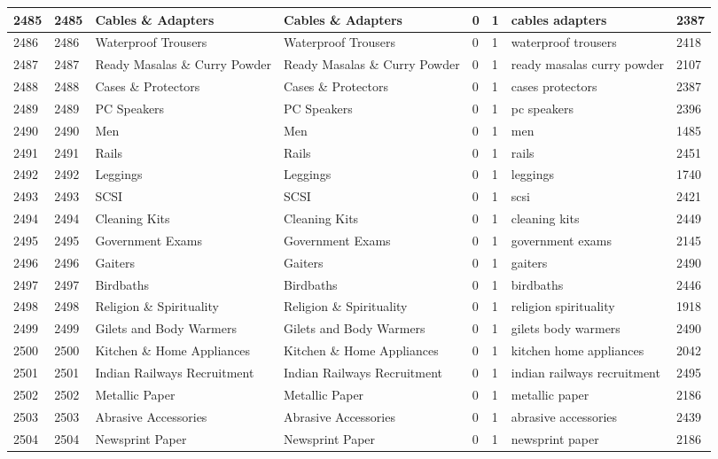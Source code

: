 \begin{longtable}{|l|l|l|l|l|l|l|l|}
2485 & 2485 & Cables \& Adapters & Cables \& Adapters & 0 & 1 & cables adapters & 2387 \\ \hline 
2486 & 2486 & Waterproof Trousers & Waterproof Trousers & 0 & 1 & waterproof trousers & 2418 \\ \hline 
2487 & 2487 & Ready Masalas \& Curry Powder & Ready Masalas \& Curry Powder & 0 & 1 & ready masalas curry powder & 2107 \\ \hline 
2488 & 2488 & Cases \& Protectors & Cases \& Protectors & 0 & 1 & cases protectors & 2387 \\ \hline 
2489 & 2489 & PC Speakers & PC Speakers & 0 & 1 & pc speakers & 2396 \\ \hline 
2490 & 2490 & Men & Men & 0 & 1 & men & 1485 \\ \hline 
2491 & 2491 & Rails & Rails & 0 & 1 & rails & 2451 \\ \hline 
2492 & 2492 & Leggings & Leggings & 0 & 1 & leggings & 1740 \\ \hline 
2493 & 2493 & SCSI & SCSI & 0 & 1 & scsi & 2421 \\ \hline 
2494 & 2494 & Cleaning Kits & Cleaning Kits & 0 & 1 & cleaning kits & 2449 \\ \hline 
2495 & 2495 & Government Exams & Government Exams & 0 & 1 & government exams & 2145 \\ \hline 
2496 & 2496 & Gaiters & Gaiters & 0 & 1 & gaiters & 2490 \\ \hline 
2497 & 2497 & Birdbaths & Birdbaths & 0 & 1 & birdbaths & 2446 \\ \hline 
2498 & 2498 & Religion \& Spirituality & Religion \& Spirituality & 0 & 1 & religion spirituality & 1918 \\ \hline 
2499 & 2499 & Gilets and Body Warmers & Gilets and Body Warmers & 0 & 1 & gilets body warmers & 2490 \\ \hline 
2500 & 2500 & Kitchen \& Home Appliances & Kitchen \& Home Appliances & 0 & 1 & kitchen home appliances & 2042 \\ \hline 
2501 & 2501 & Indian Railways Recruitment & Indian Railways Recruitment & 0 & 1 & indian railways recruitment & 2495 \\ \hline 
2502 & 2502 & Metallic Paper & Metallic Paper & 0 & 1 & metallic paper & 2186 \\ \hline 
2503 & 2503 & Abrasive Accessories & Abrasive Accessories & 0 & 1 & abrasive accessories & 2439 \\ \hline 
2504 & 2504 & Newsprint Paper & Newsprint Paper & 0 & 1 & newsprint paper & 2186 \\ \hline 

\end{longtable}

